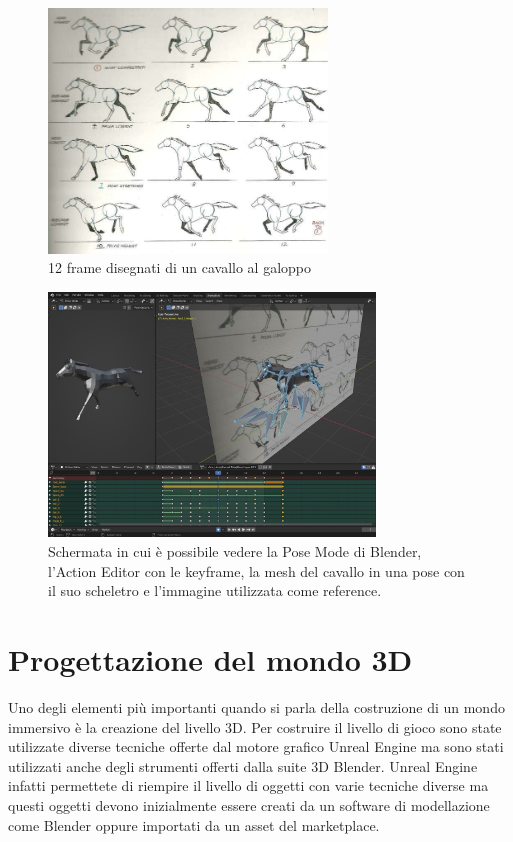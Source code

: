     \begin{figure}[!ht]
        \centering
        \includegraphics[height=6.5cm]{figure/HorseAnimation.jpg}
        \caption{12 frame disegnati di un cavallo al galoppo}
    \end{figure}

    \begin{figure}[!ht]
        \centering
        \includegraphics[height=6.5cm]{figure/PoseMode2.JPG}
        \caption{Schermata in cui è possibile vedere la Pose Mode di Blender, l'Action Editor con le keyframe, la mesh del cavallo in una pose con il suo scheletro e l'immagine utilizzata come reference.}
    \end{figure}
    
    \section{Progettazione del mondo 3D}

    Uno degli elementi più importanti quando si parla della costruzione di un mondo immersivo è la creazione del livello 3D.
    Per costruire il livello di gioco sono state utilizzate diverse tecniche offerte dal motore grafico Unreal Engine ma sono stati utilizzati anche degli strumenti offerti dalla suite 3D Blender.
    Unreal Engine infatti permettete di riempire il livello di oggetti con varie tecniche diverse ma questi oggetti devono inizialmente essere creati da un software di modellazione come Blender oppure importati da un asset del marketplace.

